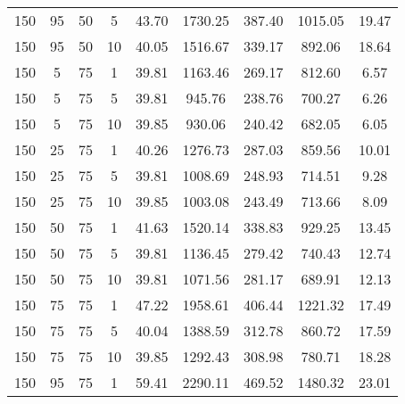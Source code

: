 \begin{table}[h]
\begin{tabular}{cccc|c|c|c|c|c}
150 & 95 & 50 & 5 & \cellcolor{gray!11}43.70 & \cellcolor{gray!1}1730.25 & \cellcolor{gray!1}387.40 & \cellcolor{gray!1}1015.05 & 19.47\\
150 & 95 & 50 & 10 & \cellcolor{gray!48}40.05 & \cellcolor{gray!1}1516.67 & \cellcolor{gray!1}339.17 & \cellcolor{gray!1}892.06 & 18.64\\
150 & 5 & 75 & 1 & \cellcolor{gray!50}39.81 & \cellcolor{gray!7}1163.46 & \cellcolor{gray!13}269.17 & \cellcolor{gray!8}812.60 & 6.57\\
150 & 5 & 75 & 5 & \cellcolor{gray!50}39.81 & \cellcolor{gray!48}945.76 & \cellcolor{gray!48}238.76 & \cellcolor{gray!43}700.27 & 6.26\\
150 & 5 & 75 & 10 & \cellcolor{gray!50}39.85 & \cellcolor{gray!50}930.06 & \cellcolor{gray!46}240.42 & \cellcolor{gray!49}682.05 & 6.05\\
150 & 25 & 75 & 1 & \cellcolor{gray!46}40.26 & \cellcolor{gray!1}1276.73 & \cellcolor{gray!1}287.03 & \cellcolor{gray!1}859.56 & 10.01\\
150 & 25 & 75 & 5 & \cellcolor{gray!50}39.81 & \cellcolor{gray!36}1008.69 & \cellcolor{gray!36}248.93 & \cellcolor{gray!39}714.51 & 9.28\\
150 & 25 & 75 & 10 & \cellcolor{gray!50}39.85 & \cellcolor{gray!37}1003.08 & \cellcolor{gray!42}243.49 & \cellcolor{gray!39}713.66 & 8.09\\
150 & 50 & 75 & 1 & \cellcolor{gray!32}41.63 & \cellcolor{gray!1}1520.14 & \cellcolor{gray!1}338.83 & \cellcolor{gray!1}929.25 & 13.45\\
150 & 50 & 75 & 5 & \cellcolor{gray!50}39.81 & \cellcolor{gray!12}1136.45 & \cellcolor{gray!1}279.42 & \cellcolor{gray!31}740.43 & 12.74\\
150 & 50 & 75 & 10 & \cellcolor{gray!50}39.81 & \cellcolor{gray!24}1071.56 & \cellcolor{gray!1}281.17 & \cellcolor{gray!47}689.91 & 12.13\\
150 & 75 & 75 & 1 & \cellcolor{gray!1}47.22 & \cellcolor{gray!1}1958.61 & \cellcolor{gray!1}406.44 & \cellcolor{gray!1}1221.32 & 17.49\\
150 & 75 & 75 & 5 & \cellcolor{gray!48}40.04 & \cellcolor{gray!1}1388.59 & \cellcolor{gray!1}312.78 & \cellcolor{gray!1}860.72 & 17.59\\
150 & 75 & 75 & 10 & \cellcolor{gray!50}39.85 & \cellcolor{gray!1}1292.43 & \cellcolor{gray!1}308.98 & \cellcolor{gray!18}780.71 & 18.28\\
150 & 95 & 75 & 1 & \cellcolor{gray!1}59.41 & \cellcolor{gray!1}2290.11 & \cellcolor{gray!1}469.52 & \cellcolor{gray!1}1480.32 & 23.01\\

\end{tabular}
\end{table}
